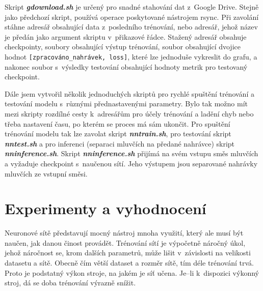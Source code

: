 Skript \textbf{\textit{gdownload.sh}} je určený pro snadné stahování dat z~Google Drive. Stejně jako předchozí skript, používá operace poskytované nástrojem rsync. Při zavolání stáhne adresář obsahující data z~posledního trénování, nebo adresář, jehož název je předán jako argument skriptu v~přikazové řádce.   
Stažený adresář obsahuje checkpointy, soubory obsahující výstup trénování, soubor obsahující dvojice hodnot \texttt{[zpracováno\_nahrávek, loss]}, které lze jednoduše vykreslit do grafu, a nakonec soubor s~výsledky testování obsahující hodnoty metrik pro testovaný checkpoint.

Dále jsem vytvořil několik jednoduchých skriptů pro rychlé spuštění trénování a testování modelu s~různými přednastavenými parametry. Bylo tak možno mít mezi skripty rozdílné cesty k~adresářům pro účely trénování a ladění chyb nebo třeba nastavení času, po kterém se proces má sám ukončit. Pro spuštění trénování modelu tak lze zavolat skript \textbf{\textit{nntrain.sh}}, pro testování skript \textbf{\textit{nntest.sh}} a pro inferenci (separaci mluvčích na předané nahrávce) skript \textbf{\textit{nninference.sh}}. Skript \textbf{\textit{nninference.sh}} přijímá na svém vstupu směs mluvčích a vyžaduje checkpoint s~naučenou sítí. Jeho výstupem jsou separované nahrávky mluvčích ze vstupní směsi.


\bigskip






\chapter{Experimenty a vyhodnocení}
\label{experimenty}
Neuronové sítě představují mocný nástroj mnoha využití, který ale musí být naučen, jak danou činost provádět. Trénování sítí je výpočetně náročný úkol, jehož náročnost se, krom dalších parametrů, může lišit v~závislosti na velikosti datasetu a sítě. Obecně čím větší dataset a rozměr sítě, tím déle trénování trvá. Proto je podstatný výkon stroje, na jakém je síť učena. Je--li k~dispozici výkonný stroj, dá se doba trénování výrazně snížit.

